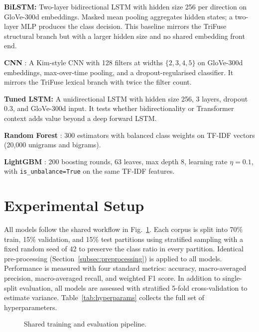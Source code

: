 \documentclass[10pt,twocolumn,a4paper]{article}
\begin{document}
\textbf{BiLSTM:} Two-layer bidirectional LSTM with hidden size 256 per direction on GloVe-300d embeddings. Masked mean pooling aggregates hidden states; a two-layer MLP produces the class decision. This baseline mirrors the TriFuse structural branch but with a larger hidden size and no shared embedding front end.

\textbf{CNN} \citep{ref7}: A Kim-style CNN with 128 filters at widths $\{2,3,4,5\}$ on GloVe-300d embeddings, max-over-time pooling, and a dropout-regularised classifier. It mirrors the TriFuse lexical branch with twice the filter count.

\textbf{Tuned LSTM:} A unidirectional LSTM with hidden size 256, 3 layers, dropout 0.3, and GloVe-300d input. It tests whether bidirectionality or Transformer context adds value beyond a deep forward LSTM.

\textbf{Random Forest} \citep{ref5}: 300 estimators with balanced class weights on TF-IDF vectors (20,000 unigrams and bigrams).

\textbf{LightGBM} \citep{ref6}: 200 boosting rounds, 63 leaves, max depth 8, learning rate $\eta{=}0.1$, with \texttt{is\_unbalance=True} on the same TF-IDF features.

\section{Experimental Setup}\label{sec:setup}

All models follow the shared workflow in Fig.~\ref{fig:pipeline}. Each corpus is split into 70\% train, 15\% validation, and 15\% test partitions using stratified sampling with a fixed random seed of 42 to preserve the class ratio in every partition. Identical pre-processing (Section~\ref{subsec:preprocessing}) is applied to all models. Performance is measured with four standard metrics: accuracy, macro-averaged precision, macro-averaged recall, and weighted F1 score. In addition to single-split evaluation, all models are assessed with stratified 5-fold cross-validation to estimate variance. Table~\ref{tab:hyperparams} collects the full set of hyperparameters.

\begin{figure}[!t]
\centering

\caption{Shared training and evaluation pipeline.}
\label{fig:pipeline}
\end{figure}
\end{document}
